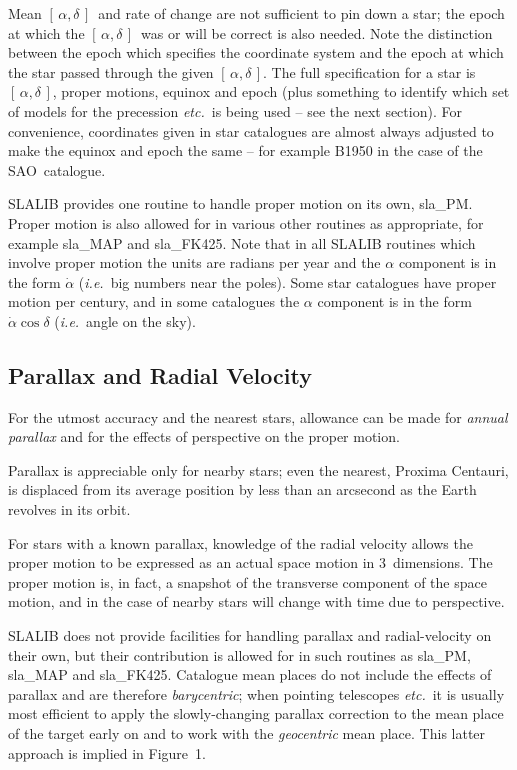 \documentclass[11pt,twoside]{article}
\newcommand{\radec}     {$[\,\alpha,\delta\,]$}
\begin{document}
Mean \radec\ and rate of change are not sufficient to pin
down a star;  the epoch at which the \radec\ was or will
be correct is also needed.  Note the distinction
between the epoch which specifies the
coordinate system and the epoch at which the star passed
through the given \radec.  The full specification for a star
is \radec, proper motions, equinox and epoch (plus something to
identify which set of models for the precession {\it etc.}\ is 
being used -- see the next section).
For convenience, coordinates given in star catalogues are almost
always adjusted to make the equinox and epoch the same -- for
example B1950 in the case of the SAO~catalogue.

SLALIB provides one routine to handle proper motion on its own,
sla\_PM.
Proper motion is also allowed for in various other
routines as appropriate, for example
sla\_MAP
and
sla\_FK425.
Note that in all SLALIB routines which involve proper motion
the units are radians per year and the
$\alpha$ component is in the form $\dot{\alpha}$ ({\it i.e.}\ big
numbers near the poles).
Some star catalogues have proper motion per century, and
in some catalogues the $\alpha$ component is in the form
$\dot{\alpha}\cos\delta$ ({\it i.e.}\ angle on the sky).

\subsection{Parallax and Radial Velocity}
For the utmost accuracy and the nearest stars, allowance can
be made for {\it annual parallax}\/ and for the effects of perspective
on the proper motion.

Parallax is appreciable only for nearby stars;  even
the nearest, Proxima Centauri, is displaced from its average
position by less than
an arcsecond as the Earth revolves in its orbit.

For stars with a known parallax, knowledge of the radial velocity
allows the proper motion to be expressed as an actual space
motion in 3~dimensions.  The proper motion is,
in fact, a snapshot of the transverse component of the
space motion, and in the case of nearby stars will
change with time due to perspective.

SLALIB does not provide facilities for handling parallax
and radial-velocity on their own, but their contribution is
allowed for in such routines as
sla\_PM,
sla\_MAP
and
sla\_FK425.
Catalogue mean
places do not include the effects of parallax and are therefore
{\it barycentric};  when pointing telescopes {\it etc.}\ it is 
usually most efficient to apply the slowly-changing
parallax correction to the mean place of the target early on
and to work with the {\it geocentric}\/ mean place.  This latter
approach is implied in Figure~1.
\end{document}
